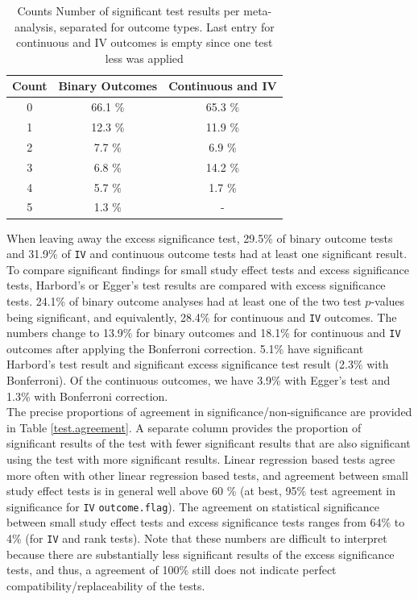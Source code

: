 \documentclass[11pt,a4paper,twoside]{book}\usepackage[]{graphicx}\usepackage[]{color}
\begin{document}
\begin{table}[ht]
\centering
\begingroup\footnotesize
\begin{tabular}{ccc}
  \hline
Count & Binary Outcomes & Continuous and IV \\ 
  \hline
0 & 66.1 \% & 65.3 \% \\ 
  1 & 12.3 \% & 11.9 \% \\ 
  2 & 7.7 \% & 6.9 \% \\ 
  3 & 6.8 \% & 14.2 \% \\ 
  4 & 5.7 \% & 1.7 \% \\ 
  5 & 1.3 \% & - \\ 
   \hline
\end{tabular}
\endgroup
\caption{Counts Number of significant test results per meta-analysis, separated
       for outcome types. Last entry for continuous and IV outcomes is empty since one test less was 
       applied} 
\label{number.sig.tests}
\end{table}


When leaving away the excess significance test, 29.5\% of binary outcome tests and 31.9\% of \texttt{IV} and continuous outcome tests had at least one significant result. 
To compare significant findings for small study effect tests and excess significance tests, Harbord's or Egger's test results are compared with excess significance tests. 24.1\% of binary outcome analyses had at least one of the two test $p$-values being significant, and equivalently, 28.4\% for continuous and \texttt{IV} outcomes. The numbers change to 13.9\% for binary outcomes and 18.1\% for continuous and \texttt{IV} outcomes after applying the Bonferroni correction. 5.1\% have significant Harbord's test result and significant excess significance test result  (2.3\% with Bonferroni). Of the continuous outcomes, we have 3.9\% with Egger's test and 1.3\% with Bonferroni correction. \\
The precise proportions of agreement in significance/non-significance are provided in Table \ref{test.agreement}. A separate column provides the proportion of significant results of the test with fewer significant results that are also significant using the test with more significant results. 
Linear regression based tests agree more often with other linear regression based tests, and agreement between small study effect tests is in general well above 60 \% (at best, 95\% test agreement in significance for \texttt{IV} \texttt{outcome.flag}). The agreement on statistical significance between small study effect tests and excess significance tests ranges from 64\% to 4\% (for \texttt{IV} and rank tests). Note that these numbers are difficult to interpret because there are substantially less significant results of the excess significance tests, and thus, a agreement of 100\% still does not indicate perfect compatibility/replaceability of the tests.
\end{document}
